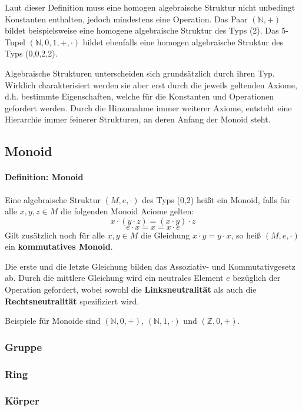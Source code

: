 Laut dieser Definition muss eine homogen algebraische Struktur nicht unbedingt Konstanten enthalten, jedoch mindestens eine Operation. Das Paar $(\mathbb{N},+)$ bildet beispielsweise eine homogene algebraische Struktur des Typs (2). Das 5-Tupel $(\mathbb{N},0,1,+,\cdot)$ bildet ebenfalls eine homogen algebraische Struktur des Typs (0,0,2,2).

Algebraische Strukturen unterscheiden sich grundsätzlich durch ihren Typ. Wirklich charakterisiert werden sie aber erst durch die jeweils geltenden Axiome, d.h. bestimmte Eigenschaften, welche für die Konstanten und Operationen gefordert werden. Durch die Hinzunahme immer weiterer Axiome, entsteht eine Hierarchie immer feinerer Strukturen, an deren Anfang der Monoid steht.

\subsection{Monoid}
\paragraph{Definition: Monoid}
Eine algebraische Struktur $(M,e,\cdot)$ des Typs (0,2) heißt ein Monoid, falls für alle $x,y,z\in M$ die folgenden Monoid Aciome gelten: $$x \cdot (y \cdot z) = (x \cdot y) \cdot z$$ $$ e \cdot x = x = x \cdot e$$ Gilt zusätzlich noch für alle $x,y \in M$ die Gleichung $x \cdot y = y \cdot x$, so heiß $(M,e,\cdot)$ ein \textbf{kommutatives Monoid}.

Die erste und die letzte Gleichung bilden das Assoziativ- und Kommutativgesetz ab. Durch die mittlere Gleichung wird ein neutrales Element $e$ bezüglich der Operation gefordert, wobei sowohl die \textbf{Linksneutralität} als auch die \textbf{Rechtsneutralität} spezifiziert wird.

Beispiele für Monoide sind $(\mathbb{N},0,+)$, $(\mathbb{N},1,\cdot)$ und $(\mathbb{Z},0,+)$.

\subsubsection{Gruppe}
\subsubsection{Ring}
\subsubsection{Körper}

